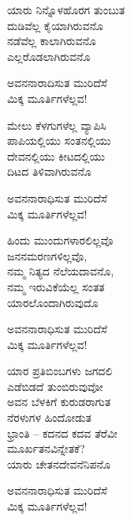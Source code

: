 \begin{myquote}
ಯಾರು ನಿನ್ನೊಳಹೊರಗ ತುಂಬುತ\\ದುಡಿವೆಲ್ಲ ಕೈಯಾಗಿರುವನೊ\\ನಡೆವೆಲ್ಲ ಕಾಲಾಗಿರುವನೊ\\ಎಲ್ಲರೊಡಲಾಗಿರುವನೊ
\end{myquote}

\begin{myquote}
ಅವನನಾರಾದಿಸುತ ಮುರಿದೆಸೆ\\ಮಿಕ್ಕ ಮೂರ್ತಿಗಳೆಲ್ಲವ!
\end{myquote}

\begin{myquote}
ಮೇಲು ಕೆಳಗುಗಳೆಲ್ಲ ವ್ಯಾಪಿಸಿ\\ಪಾಪಿಯಲ್ಲಿಯು ಸಂತನಲ್ಲಿಯು\\ದೇವನಲ್ಲಿಯು ಕೀಟದಲ್ಲಿಯು\\ದಿಟದ ತಿಳಿವಾಗಿರುವನೊ
\end{myquote}

\begin{myquote}
ಅವನನಾರಾಧಿಸುತ ಮುರಿದೆಸೆ\\ಮಿಕ್ಕ ಮೂರ್ತಿಗಳೆಲ್ಲವ!
\end{myquote}

\begin{myquote}
ಹಿಂದು ಮುಂದುಗಳಾರಲಿಲ್ಲವೊ\\ಜನನಮರಣಗಳಿಲ್ಲವೊ,\\ನಮ್ಮ ನಿತ್ಯದ ನೆಲೆಯದಾವನೊ,\\ನಮ್ಮ ಇರುವಿಕೆಯೆಲ್ಲ ಸಂತತ\\ಯಾರಲೊಂದಾಗಿರುವುದೊ
\end{myquote}

\begin{myquote}
ಅವನನಾರಾಧಿಸುತ ಮುರಿದೆಸೆ\\ಮಿಕ್ಕ ಮೂರ್ತಿಗಳೆಲ್ಲವ!
\end{myquote}

\begin{myquote}
ಯಾರ ಪ್ರತಿಬಿಂಬಗಳು ಜಗದಲಿ\\ಎಡೆಬಿಡದೆ ತುಂಬಿರುವುವೋ\\ಅವನ ಬೆಳಕಿಗೆ ಕುರುಡರಾಗುತ\\ನೆರಳುಗಳ ಹಿಂದೋಡುತ\\ಭ್ರಾಂತಿ – ಕದನದ ಕದವ ತೆರೆವೀ\\ಮೂರ್ಖತನವಿನ್ನೇತಕೆ?\\ಯಾರು ಚೇತನದೇವನೆನಿಪನೊ
\end{myquote}

\begin{myquote}
ಅವನನಾರಾಧಿಸುತ ಮುರಿದೆಸೆ\\ಮಿಕ್ಕ ಮೂರ್ತಿಗಳೆಲ್ಲವ!
\end{myquote}

